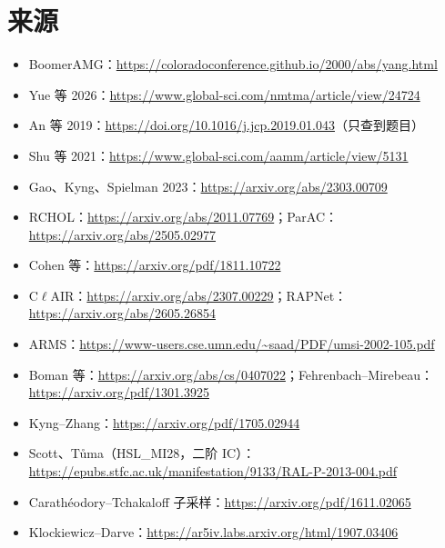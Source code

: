 \documentclass[11pt,a4paper]{ctexart}
\begin{document}
\section*{来源}
\begin{footnotesize}
\begin{itemize}[leftmargin=1.2em]
\item BoomerAMG：\url{https://coloradoconference.github.io/2000/abs/yang.html}
\item Yue 等 2026：\url{https://www.global-sci.com/nmtma/article/view/24724}
\item An 等 2019：\url{https://doi.org/10.1016/j.jcp.2019.01.043}（只查到题目）
\item Shu 等 2021：\url{https://www.global-sci.com/aamm/article/view/5131}
\item Gao、Kyng、Spielman 2023：\url{https://arxiv.org/abs/2303.00709}
\item RCHOL：\url{https://arxiv.org/abs/2011.07769}；ParAC：\url{https://arxiv.org/abs/2505.02977}
\item Cohen 等：\url{https://arxiv.org/pdf/1811.10722}
\item C$\ell$AIR：\url{https://arxiv.org/abs/2307.00229}；RAPNet：\url{https://arxiv.org/abs/2605.26854}
\item ARMS：\url{https://www-users.cse.umn.edu/~saad/PDF/umsi-2002-105.pdf}
\item Boman 等：\url{https://arxiv.org/abs/cs/0407022}；Fehrenbach--Mirebeau：\url{https://arxiv.org/pdf/1301.3925}
\item Kyng--Zhang：\url{https://arxiv.org/pdf/1705.02944}
\item Scott、Tůma（HSL\_MI28，二阶 IC）：\\ \url{https://epubs.stfc.ac.uk/manifestation/9133/RAL-P-2013-004.pdf}
\item Carathéodory--Tchakaloff 子采样：\url{https://arxiv.org/pdf/1611.02065}
\item Klockiewicz--Darve：\url{https://ar5iv.labs.arxiv.org/html/1907.03406}
\end{itemize}
\end{footnotesize}
\end{document}
